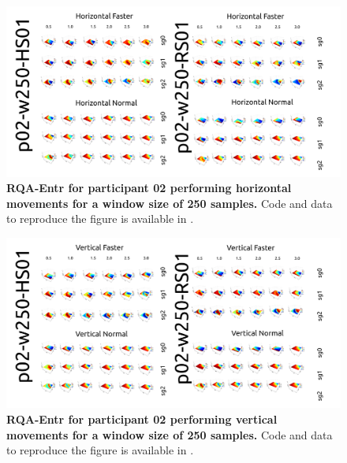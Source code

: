 \documentclass[12pt]{article}
\begin{document}
\newpage
\begin{figure}[ht!]
\centering
\includegraphics{figures/rqa/output/epsilons/rqa-epsilonsp02w250Horizontal}
    	\caption{
	{\bf RQA-Entr for participant 02 performing horizontal movements for a window size of 250 samples.}
	Code and data to reproduce the figure is available in \cite{srep2021}.
        }
    \label{fig-p02-H-w250}
\end{figure}
\begin{figure}[hb!]
\centering
\includegraphics{figures/rqa/output/epsilons/rqa-epsilonsp02w250Vertical}
    	\caption{
	{\bf RQA-Entr for participant 02 performing vertical movements for a window size of 250 samples.}
	Code and data to reproduce the figure is available in \cite{srep2021}.
        }
    \label{fig-p02-V-w250}
\end{figure}
\end{document}
